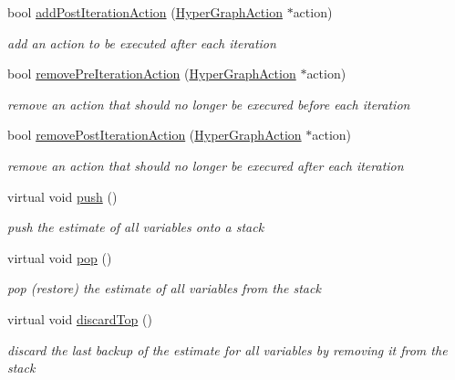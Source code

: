 \begin{DoxyCompactItemize}
bool \mbox{\hyperlink{structg2o_1_1_optimizable_graph_a6db1ecbc582a7b79e1633eefc2109b26}{add\+Post\+Iteration\+Action}} (\mbox{\hyperlink{classg2o_1_1_hyper_graph_action}{Hyper\+Graph\+Action}} $\ast$action)
\begin{DoxyCompactList}\small\item\em add an action to be executed after each iteration \end{DoxyCompactList}\item 
bool \mbox{\hyperlink{structg2o_1_1_optimizable_graph_a27f5ee7016b20bc6def24a2726fc824b}{remove\+Pre\+Iteration\+Action}} (\mbox{\hyperlink{classg2o_1_1_hyper_graph_action}{Hyper\+Graph\+Action}} $\ast$action)
\begin{DoxyCompactList}\small\item\em remove an action that should no longer be execured before each iteration \end{DoxyCompactList}\item 
bool \mbox{\hyperlink{structg2o_1_1_optimizable_graph_a172f2f5c8ec5872d5bc34077c6391839}{remove\+Post\+Iteration\+Action}} (\mbox{\hyperlink{classg2o_1_1_hyper_graph_action}{Hyper\+Graph\+Action}} $\ast$action)
\begin{DoxyCompactList}\small\item\em remove an action that should no longer be execured after each iteration \end{DoxyCompactList}\item 
virtual void \mbox{\hyperlink{structg2o_1_1_optimizable_graph_a3db385b25818a5659d1fa8407cb0db45}{push}} ()
\begin{DoxyCompactList}\small\item\em push the estimate of all variables onto a stack \end{DoxyCompactList}\item 
virtual void \mbox{\hyperlink{structg2o_1_1_optimizable_graph_a8487f537b16ac7a2ee416ea294a1e22e}{pop}} ()
\begin{DoxyCompactList}\small\item\em pop (restore) the estimate of all variables from the stack \end{DoxyCompactList}\item 
virtual void \mbox{\hyperlink{structg2o_1_1_optimizable_graph_a368b5f22dbc57abd2f651a20d039f61c}{discard\+Top}} ()
\begin{DoxyCompactList}\small\item\em discard the last backup of the estimate for all variables by removing it from the stack \end{DoxyCompactList}\item 

\end{DoxyCompactItemize}
